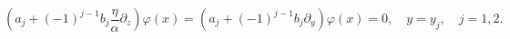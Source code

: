 \begin{equation}
\left( a_{j}+(-1)^{j-1}b_{j}\frac{\eta}{\alpha}\partial
_{z}\right) \varphi (x)=\left( a_{j}+(-1)^{j-1}b_{j}\partial
_{y}\right) \varphi (x)=0,\quad y=y_{j},\quad j=1,2.
\label{boundcond1}
\end{equation}

